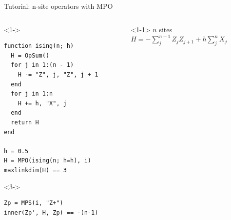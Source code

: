 \begin{frame}[fragile]{Tutorial: n-site operators with MPO}

\begin{columns}

\begin{column}{5cm}

\begin{onlyenv}<1->
\begin{lstlisting}[language=JuliaLocal, style=julia, mathescape, basicstyle=\small]
function ising(n; h)
  H = OpSum()
  for j in 1:(n - 1)
    H -= "Z", j, "Z", j + 1
  end
  for j in 1:n
    H += h, "X", j
  end
  return H
end

h = 0.5
H = MPO(ising(n; h=h), i)
maxlinkdim(H) == 3
\end{lstlisting}
\end{onlyenv}

\begin{onlyenv}<3->
\begin{lstlisting}[language=JuliaLocal, style=julia, mathescape, basicstyle=\small]
Zp = MPS(i, "Z+")
inner(Zp', H, Zp) == -(n-1)
 \end{lstlisting}
\end{onlyenv}

\end{column}

\begin{column}{5.5cm}

\begin{onlyenv}<1-1>
$n$ sites \\
$H = -\sum_j^{n-1} Z_j Z_{j+1} + h \sum_j^n X_j$ \\
~\\
~\\
~\\
~\\
~\\
~\\
~\\
~\\
\end{onlyenv}


\end{column}
\end{columns}
\end{frame}
